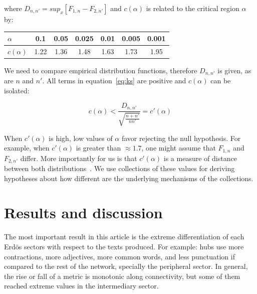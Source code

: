 \documentclass[%
 aip,
 jmp,%
 amsmath,amssymb,
 reprint,%
]{revtex4-1}
\begin{document}
\noindent where $D_{n,n'}=sup_x[F_{1,n}-F_{2,n'}]$ and $c(\alpha)$ is related to the critical region $\alpha$ by:

\begin{table}[H]
\centering
\begin{tabular}{|l||c|c|c|c|c|c|}\hline
$\alpha$    & 0.1  & 0.05 & 0.025 & 0.01 & 0.005 & 0.001 \\\hline
$c(\alpha)$ & 1.22 & 1.36 & 1.48  & 1.63 & 1.73  & 1.95  \\\hline
\end{tabular}
\end{table}

We need to compare empirical distribution functions, therefore $D_{n,n'}$ is given, as are $n$ and $n'$. All terms in equation~\ref{eq:ks} are positive and $c(\alpha)$ can be isolated:

\begin{equation}\label{eq:ks2}
c(\alpha) < \frac{D_{n,n'}}{\sqrt{\frac{n+n'}{nn'}}} = c'(\alpha)
\end{equation}

When $c'(\alpha)$ is high, low values of $\alpha$ favor rejecting the null hypothesis.
For example, when $c'(\alpha)$ is greater than $\approx 1.7$, one might assume that $F_{1,n}$ and $F_{2,n'}$ differ.
More importantly for us is that $c'(\alpha)$ is a measure of distance between both distributions~\cite{kolm}.
We use collections of these values for deriving hypotheses
about how different are the underlying mechanisms of the collections.


\section{Results and discussion}\label{sec:results}

The most important result in this article is the
extreme differentiation of each Erd\"os sectors with respect to the texts produced.
For example: hubs use more contractions, more adjectives,
more common words, and less punctuation if compared to the rest of the network,
specially the peripheral sector.
In general, the rise or fall of a metric is monotonic along connectivity,
but some of them reached extreme values in the intermediary sector.
\end{document}
